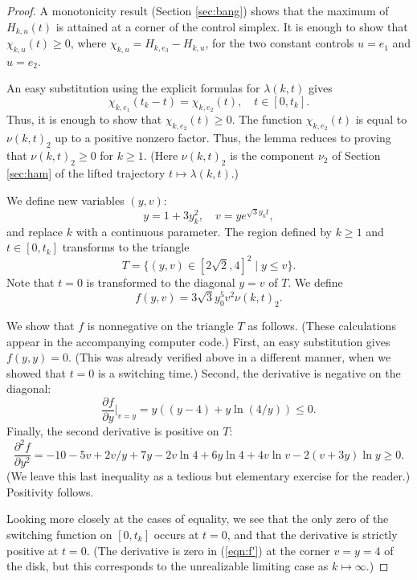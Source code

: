 \documentclass{article}
\theoremstyle{remark}
\newcommand{\partials}[2]{\frac{\partial #1}{\partial #2}}
\begin{document}
\begin{proof}
  A monotonicity result  (Section \ref{sec:bang}) shows
  that the maximum of $H_{k,u}(t)$ is attained at a corner of the control simplex.  It
  is enough to show that $ \chi_{k,u}(t)\ge 0$, where
  $\chi_{k,u}=H_{k,e_3}-H_{k,u}$, for the two constant controls
  $u=e_1$ and $u=e_2$.  

An easy substitution using
  the explicit formulas for $\lambda(k,t)$ gives
\[
\chi_{k,e_1}(t_k-t) = \chi_{k,e_2}(t),\quad t\in[0,t_k].
\]
Thus, it is enough to show that $\chi_{k,e_2}(t)\ge 0$.  The function
$\chi_{k,e_2}(t)$ is equal to $\nu(k,t)_2$ up to a positive
nonzero factor.  Thus, the lemma reduces to proving that
$\nu(k,t)_2\ge0$ for $k\ge 1$.  (Here $\nu(k,t)_2$ is
the component $\nu_2$ of Section \ref{sec:ham} of the lifted trajectory
$t \mapsto \lambda(k,t)$.)

We define new variables $(y,v)$:
\[
y = 1+ 3y_k^2,\quad v = y e^{\sqrt{3} y_k t},
\]
and replace $k$ with a continuous parameter.  The region defined
by $k\ge1$ and $t\in[0,t_k]$ transforms to the triangle 
\[
T=\{(y,v)\in [2\sqrt{2},4]^2\mid  y\le v\}.
\]
Note that $t=0$ is transformed to the diagonal $y=v$ of $T$.
We define
\[
f(y,v) = 3\sqrt{3} y_0^5 v^2 \nu(k,t)_2.
\]

We show that $f$ is nonnegative on the triangle $T$ as follows.
(These calculations appear in the accompanying computer  code.)
First, an easy substitution gives $f(y,y)=0$.  (This was already
verified above in a different manner, when we showed that $t=0$ is a
switching time.)  Second, the derivative is negative on the diagonal:
\begin{equation}\label{eqn:f'}
\partials {f}{y}|_{v=y} = y((y-4) + y \ln (4/y)) \le 0.
\end{equation}
Finally, the second derivative is positive on $T$:
\[
\frac{\partial^2 f}{\partial y^2} = -10 - 5v + 2v/y + 7y - 
 2v\ln 4 + 6y\ln 4  
+ 4v\ln v  - 2(v + 3y)\ln y\ge 0.
\]
(We leave this last inequality as a tedious but elementary exercise for the reader.)
Positivity follows.

Looking more closely at the cases of equality, we see that the only
zero of the switching function on $[0,t_k]$ occurs at $t=0$, and that
the derivative is strictly positive at $t=0$.  (The derivative is zero
in (\ref{eqn:f'}) at the corner $v=y=4$ of the disk, but this
corresponds to the unrealizable limiting case as $k\mapsto\infty$.)
\end{proof}
\end{document}
